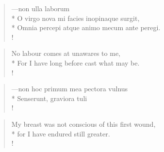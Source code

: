 {%
\begin{latin}%
\begin{verse}%
---non ulla laborum\\*
O virgo nova mi facies inopinaque surgit,\\*
Omnia percepi atque animo mecum ante peregi.\\!
\end{verse}%
\end{latin}%
\translationrule%
\begin{verse}%
No labour comes at unawares to me,\\*
For I have long before cast what may be.\\!
\end{verse}

\begin{latin}%
\begin{verse}%
---non hoc primum mea pectora vulnus\\*
Senserunt, graviora tuli\\!
\end{verse}%
\end{latin}%
\translationrule%
\begin{verse}%
My breast was not conscious of this first wound,\\*
for I have endured still greater.\\!
\end{verse}%

}

